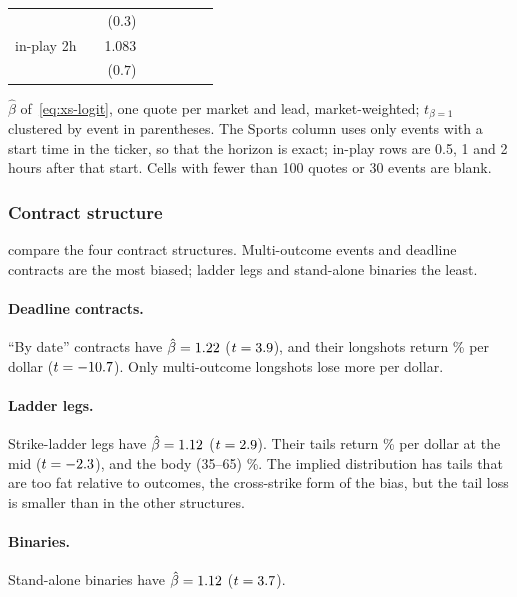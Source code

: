\begin{table}[!htbp]
\begin{threeparttable}
\begin{tabular}{@{}lrrrrrrr@{}}
 &  & ($0.3$) &  &  &  &  &  \\[1pt]
in-play 2h &  & 1.083 &  &  &  &  &  \\
 &  & ($0.7$) &  &  &  &  &  \\[1pt]
\bottomrule
\end{tabular}
\begin{tablenotes}\footnotesize
\item $\hat\beta$ of~\eqref{eq:xs-logit}, one quote per market and lead, market-weighted;
$t_{\beta=1}$ clustered by event in parentheses. The Sports column uses only events with a start
time in the ticker, so that the horizon is exact; in-play rows are 0.5, 1 and 2 hours after that
start. Cells with fewer than 100 quotes or 30 events are blank.
\end{tablenotes}
\end{threeparttable}
\end{table}

\subsubsection{Contract structure}\label{sec:res-xs-structure}

 compare the four contract structures. Multi-outcome
events and deadline contracts are the most biased; ladder legs and stand-alone binaries the least.

\paragraph{Deadline contracts.}
``By date'' contracts have $\hat\beta=1.22$ ($t=3.9$), and their
longshots return \xsStDeadlineRegLsMid\% per dollar ($t=-10.7$). Only multi-outcome longshots lose more per dollar.

\paragraph{Ladder legs.}
Strike-ladder legs have $\hat\beta=1.12$ ($t=2.9$). Their tails return
\xsStLadderRegLsMid\% per dollar at the mid ($t=-2.3$), and the body (35--65\cents)
\xsStLadderRegBodyMid\%. The implied distribution has tails that are too fat relative to outcomes,
the cross-strike form of the bias, but the tail loss is smaller than in the other structures.

\paragraph{Binaries.}
Stand-alone binaries have $\hat\beta=1.12$ ($t=3.7$).

